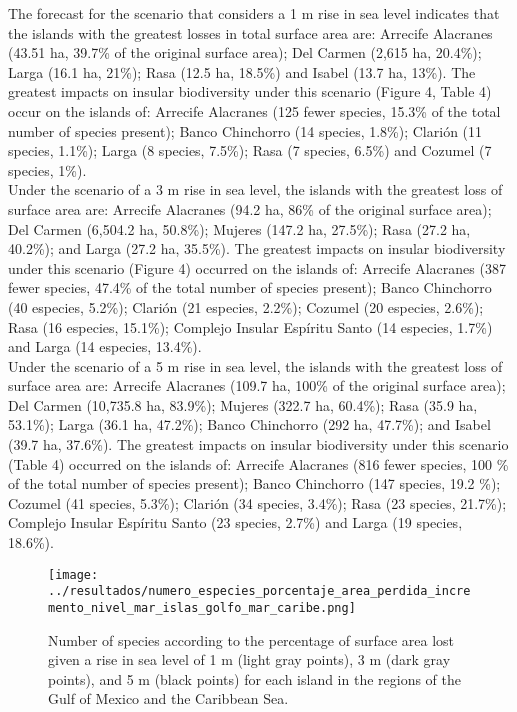 \documentclass{article} %
\begin{document}
The forecast for the scenario that considers a 1 m rise in sea level indicates that the
islands with the greatest losses in total surface area are: Arrecife Alacranes (43.51 ha, 39.7\% of the original surface area); Del Carmen (2,615 ha, 20.4\%); Larga (16.1 ha, 21\%); Rasa (12.5 ha, 18.5\%) and Isabel (13.7 ha, 13\%). The greatest impacts
on insular biodiversity under this scenario (Figure 4, Table 4) occur on the islands of:
Arrecife Alacranes (125 fewer species, 15.3\% of the total number of species present);
Banco Chinchorro (14 species, 1.8\%); Clarión (11 species, 1.1\%); Larga (8 species,
7.5\%); Rasa (7 species, 6.5\%) and Cozumel (7 species, 1\%).\\

Under the scenario of a 3 m rise in sea level, the islands with the greatest loss of
surface area are: Arrecife Alacranes (94.2 ha, 86\% of the original surface area); Del
Carmen (6,504.2 ha, 50.8\%); Mujeres (147.2 ha, 27.5\%); Rasa (27.2 ha, 40.2\%);
and Larga (27.2 ha, 35.5\%). The greatest impacts on insular biodiversity under this
scenario (Figure 4) occurred on the islands of: Arrecife Alacranes (387 fewer species,
47.4\% of the total number of species present); Banco Chinchorro (40 especies,
5.2\%); Clarión (21 especies, 2.2\%); Cozumel (20 especies, 2.6\%); Rasa (16
especies, 15.1\%); Complejo Insular Espíritu Santo (14 especies, 1.7\%) and Larga
(14 especies, 13.4\%).\\

Under the scenario of a 5 m rise in sea level, the islands with the greatest loss of
surface area are: Arrecife Alacranes (109.7 ha, 100\% of the original surface area);
Del Carmen (10,735.8 ha, 83.9\%); Mujeres (322.7 ha, 60.4\%); Rasa (35.9 ha,
53.1\%); Larga (36.1 ha, 47.2\%); Banco Chinchorro (292 ha, 47.7\%); and Isabel
(39.7 ha, 37.6\%). The greatest impacts on insular biodiversity under this scenario
(Table 4) occurred on the islands of: Arrecife Alacranes (816 fewer species, 100 \% of
the total number of species present); Banco Chinchorro (147 species, 19.2 \%);
Cozumel (41 species, 5.3\%); Clarión (34 species, 3.4\%); Rasa (23 species, 21.7\%); Complejo Insular Espíritu Santo (23 species, 2.7\%) and Larga (19 species, 18.6\%).\\


\begin{figure}
  \begin{center}
  \texttt{[image: ../resultados/numero\_especies\_porcentaje\_area\_perdida\_incremento\_nivel\_mar\_islas\_golfo\_mar\_caribe.png]}
  \caption{Number of species according to the percentage of surface area lost given a rise in sea level of 1 m (light gray points), 3 m (dark gray points), and 5 m (black points) for each island in the regions of the Gulf of Mexico and the Caribbean Sea.}
  \label{fig:number_species}
  \end{center}
\end{figure}
\end{document}
